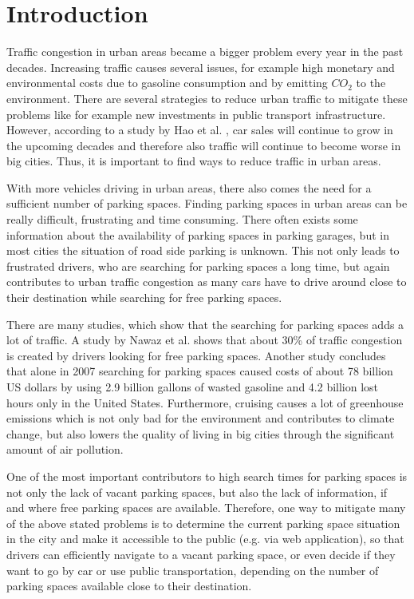 \chapter{Introduction}
\label{chap:introduction}


Traffic congestion in urban areas became a bigger problem every year in the past decades. Increasing traffic causes several issues, for example high monetary and environmental costs due to gasoline consumption and by emitting $CO_2$ to the environment. There are several strategies to reduce urban traffic to mitigate these problems like for example new investments in public transport infrastructure. However, according to a study by Hao et al. \cite{HAO2016121}, car sales will continue to grow in the upcoming decades and therefore also traffic will continue to become worse in big cities. Thus, it is important to find ways to reduce traffic in urban areas.

With more vehicles driving in urban areas, there also comes the need for a sufficient number of parking spaces. Finding parking spaces in urban areas can be really difficult, frustrating and time consuming. There often exists some information about the availability of parking spaces in parking garages, but in most cities the situation of road side parking is unknown. This not only leads to frustrated drivers, who are searching for parking spaces a long time, but again contributes to urban traffic congestion as many cars have to drive around close to their destination while searching for free parking spaces. 

There are many studies, which show that the searching for parking spaces adds a lot of traffic. A study by Nawaz et al. \cite{Nawaz:2013:PSB:2500423.2500438} shows that about 30\% of traffic congestion is created by drivers looking for free parking spaces. Another study \cite{TexasMobilityReport} concludes that alone in 2007 searching for parking spaces caused costs of about 78 billion US dollars by using 2.9 billion gallons of wasted gasoline and 4.2 billion lost hours only in the United States. Furthermore, cruising causes a lot of greenhouse emissions which is not only bad for the environment and contributes to climate change, but also lowers the quality of living in big cities through the significant amount of air pollution.

One of the most important contributors to high search times for parking spaces is not only the lack of vacant parking spaces, but also the lack of information, if and where free parking spaces are available. Therefore, one way to mitigate many of the above stated problems is to determine the current parking space situation in the city and make it accessible to the public (e.g. via web application), so that drivers can efficiently navigate to a vacant parking space, or even decide if they want to go by car or use public transportation, depending on the number of parking spaces available close to their destination. 

